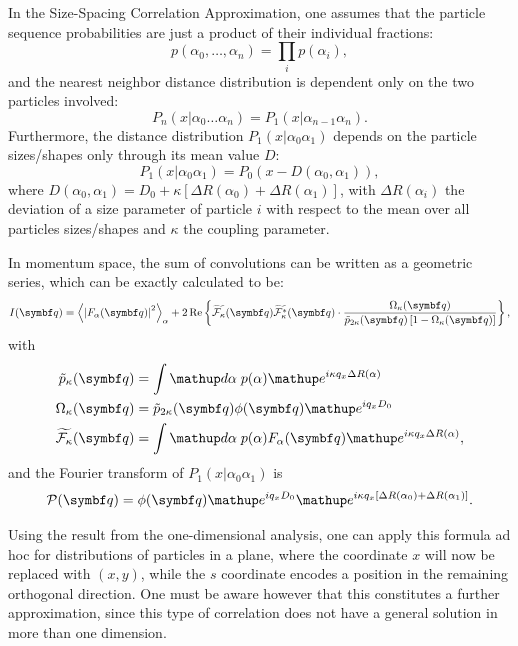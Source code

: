 In the Size-Spacing Correlation Approximation, one assumes that the particle sequence probabilities are just a product of their individual fractions:
\begin{equation*}
  p(\alpha_0,\dotsc ,\alpha_n) = \prod_i p(\alpha_i),
\end{equation*}
and the nearest neighbor distance distribution is dependent only on the two particles involved:
\begin{equation*}
  P_n(x|\alpha_0\dotsc\alpha_n) = P_1(x|\alpha_{n-1}\alpha_n).
\end{equation*}
Furthermore, the distance distribution $P_1(x|\alpha_0\alpha_1)$ depends on the particle sizes/shapes only through its mean value $D$:
\begin{equation*}
  P_1(x|\alpha_0\alpha_1) = P_0(x - D(\alpha_0,\alpha_1) ),
\end{equation*}
where $D(\alpha_0,\alpha_1) = D_0 + \kappa \left[ \Delta R(\alpha_0) + \Delta R(\alpha_1) \right]$, with $\Delta R(\alpha_i)$ the deviation of a size parameter of particle $i$ with respect to the mean over all particles sizes/shapes and $\kappa$ the coupling parameter.

In momentum space, the sum of convolutions can be written as a geometric series, which can be exactly calculated to be:
\begin{equation}
\label{Esscainf}
I(\q ) = {\bra\left| F_\alpha(\q ) \right| ^2\ket}_{\alpha}
+ 2 \Re \left\lbrace \widetilde{\curlf_\kappa}(\q )
 \widetilde{\curlf_\kappa^*}(\q ) \cdot
 \frac{\Omega_\kappa(\q )}{\tilde{p}_{2\kappa}(\q )\left
   [ 1 - \Omega_\kappa(\q )\right] } \right\rbrace,
\end{equation}
with
\begin{align*}
  \tilde{p}_\kappa(\q ) &= \int \d\alpha\; p(\alpha) \e^{i\kappa q_x \Delta R(\alpha)}  \\
  \Omega_\kappa(\q ) &= \tilde{p}_{2\kappa}(\q ) \phi(\q) \e^{i q_x D_0}  \\
  \widetilde{\curlf_\kappa}(\q ) &=
       \int \d\alpha\; p(\alpha)F_\alpha (\q ) \e^{i\kappa q_x \Delta R(\alpha)},
\end{align*}
and the Fourier transform of $P_1(x|\alpha_0\alpha_1)$ is
\begin{equation*}
  \curlp (\q ) = \phi (\q )\e^{i q_x D_0}
                    \e^{i \kappa q_x \left[ \Delta R(\alpha_0) + \Delta R(\alpha_1) \right] }.
\end{equation*}

Using the result from the one-dimensional analysis, one can apply this formula ad hoc for distributions of particles in a plane, where the coordinate $x$ will now be replaced with $(x,y)$, while the $s$ coordinate encodes a position in the remaining orthogonal direction. One must be aware however that this constitutes a further approximation, since this type of correlation does not have a general solution in more than one dimension.


